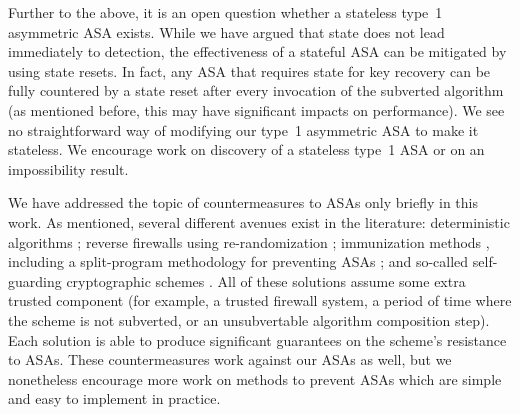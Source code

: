 Further to the above, it is an open question whether a stateless type~1 asymmetric ASA exists. While we have argued that state does not lead immediately to detection, the effectiveness of a stateful ASA can be mitigated by using state resets. In fact, any ASA that requires state for key recovery can be fully countered by a state reset after every invocation of the subverted algorithm (as mentioned before, this may have significant impacts on performance). We see no straightforward way of modifying our type~1 asymmetric ASA to make it stateless. We encourage work on discovery of a stateless type~1 ASA or on an impossibility result.

We have addressed the topic of countermeasures to ASAs only briefly in this work. As mentioned, several different avenues exist in the literature: deterministic algorithms \cite{C:BelPatRog14,FSE:DegFarPoe15,CCS:BelJaeKan15}; reverse firewalls using re-randomization \cite{CCS:AteMagVen15}; immunization methods \cite{ACNS:AFMV19}, including a split-program methodology for preventing ASAs \cite{CCS:RTYZ17,AC:RTYZ16,CCS:TanYun17}; and so-called self-guarding cryptographic schemes \cite{CSF:FisMaz18}. All of these solutions assume some extra trusted component (for example, a trusted firewall system, a period of time where the scheme is not subverted, or an unsubvertable algorithm composition step). Each solution is able to produce significant guarantees on the scheme's resistance to ASAs. These countermeasures work against our ASAs as well, but we nonetheless encourage more work on methods to prevent ASAs which are simple and easy to implement in practice.
